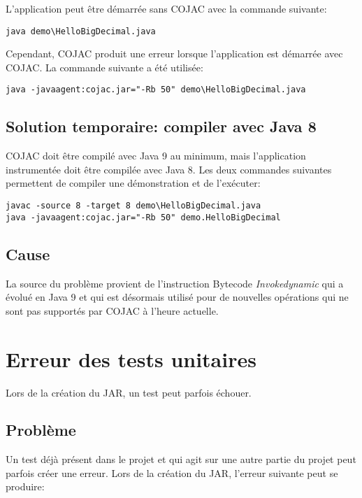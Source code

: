 L'application peut être démarrée sans \gls{COJAC} avec la commande suivante:
\begin{verbatim}
java demo\HelloBigDecimal.java
\end{verbatim}

Cependant, \gls{COJAC} produit une erreur lorsque l'application est démarrée avec \gls{COJAC}. La commande suivante a été utilisée:
\begin{verbatim}
java -javaagent:cojac.jar="-Rb 50" demo\HelloBigDecimal.java
\end{verbatim}

\subsection{Solution temporaire: compiler avec Java 8}

\gls{COJAC} doit être compilé avec Java 9 au minimum, mais l'application instrumentée doit être compilée avec Java 8. Les deux commandes suivantes permettent de compiler une démonstration et de l'exécuter:
\begin{verbatim}
javac -source 8 -target 8 demo\HelloBigDecimal.java
java -javaagent:cojac.jar="-Rb 50" demo.HelloBigDecimal
\end{verbatim}

\subsection{Cause}

La source du problème provient de l'instruction \gls{Bytecode} \textit{Invokedynamic} qui a évolué en Java 9 et qui est désormais utilisé pour de nouvelles opérations qui ne sont pas supportés par \gls{COJAC} à l'heure actuelle.

\section{Erreur des tests unitaires}

Lors de la création du \gls{JAR}, un test peut parfois échouer.

\subsection{Problème}

Un test déjà présent dans le projet et qui agit sur une autre partie du projet peut parfois créer une erreur. Lors de la création du \gls{JAR}, l'erreur suivante peut se produire:

